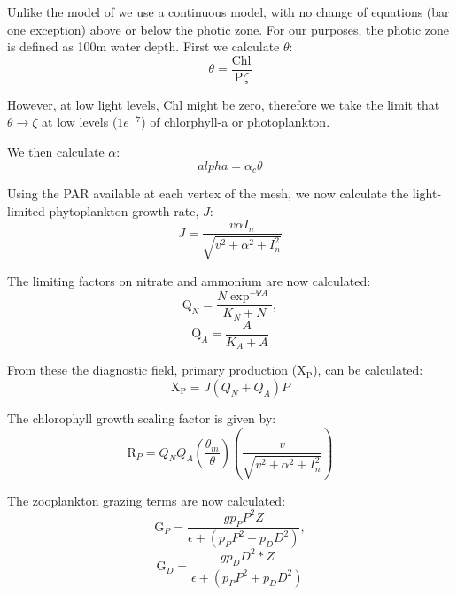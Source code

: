 Unlike the model of \citet{popova2006} we use a continuous model, with no
change of equations (bar one exception) above or below the photic zone. For
our purposes, the photic zone is defined as 100m water depth. First we calculate
$\theta$:
\begin{equation}
    \theta = \frac{\mathrm{Chl}}{\mathrm{P}\zeta}
\label{eq:bio6_theta}
\end{equation}

However, at low light levels, $\mathrm{Chl}$ might be zero, therefore
we take the limit that $\theta \rightarrow \zeta$ at low levels ($1e^{-7}$) of
chlorphyll-a or photoplankton.

We then calculate $\alpha$:
\begin{equation}
    alpha = \alpha_c \theta
\label{eq:bio6_alpha}
\end{equation}

Using the PAR available at each vertex of the mesh, we now calculate the
light-limited phytoplankton growth rate, $J$:
\begin{equation}
    J = \frac{v\alpha I_n}{\sqrt{v^2 + \alpha^2 + I_n^2}}
\label{eq:bio6_j}
\end{equation}

The limiting factors on nitrate and ammonium are now calculated:
\begin{equation}
    \mathrm{Q}_N = \frac{N\exp^{-\Psi A}}{K_N+N}\label{eq:bio6_qn}, 
\end{equation}
\begin{equation}
    \mathrm{Q}_A = \frac{A}{K_A+A}\label{eq:bio6_qa}
\end{equation}

From these the diagnostic field, primary production ($\mathrm{X_P}$), can be calculated:
\begin{equation}
    \mathrm{X_P}=J\left(Q_N + Q_A\right)P
\label{eq:bio6_primprod}
\end{equation}

The chlorophyll growth scaling factor is given by:
\begin{equation}
    \mathrm{R}_P = Q_N Q_A \left(\frac{\theta_m}{\theta}\right) \left(\frac{v}{\sqrt{v^2 + \alpha^2 + I_n^2}}\right)
\label{eq:bio6_chlgrowth}
\end{equation}

The zooplankton grazing terms are now calculated:
\begin{equation}
    \mathrm{G}_P = \frac{gp_PP^2Z}{\epsilon + \left(p_PP^2 + p_DD^2\right)}\label{eq:bio6_gp},
\end{equation}
\begin{equation}
    \mathrm{G}_D = \frac{gp_DD^2*Z}{\epsilon+\left(p_PP^2 + p_DD^2\right)}\label{eq:bio6_gd}
\end{equation}

